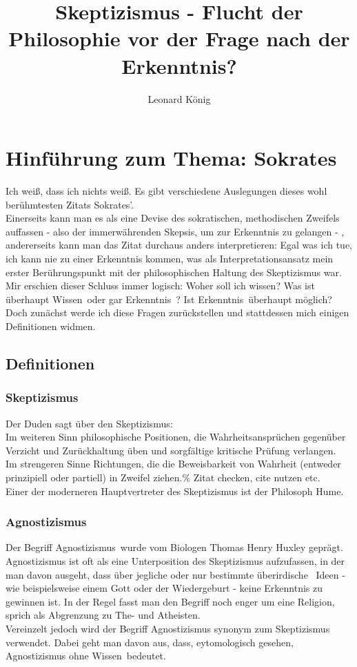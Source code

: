 \documentclass[11pt,a4paper]{article}
\author{Leonard König}
\title{Skeptizismus - Flucht der Philosophie vor der Frage nach der Erkenntnis?}
\begin{document}
\maketitle
\tableofcontents
\newpage
\section{Hinführung zum Thema: Sokrates}
\glqq Ich weiß, dass ich nichts weiß\grqq. Es gibt verschiedene Auslegungen dieses wohl berühmtesten Zitats Sokrates'.%
\\Einerseits kann man es als eine Devise des sokratischen, methodischen Zweifels auffassen - also der immerwährenden Skepsis, um zur Erkenntnis zu gelangen - , andererseits kann man das Zitat durchaus anders interpretieren: Egal was ich tue, ich kann nie zu einer Erkenntnis kommen, was als Interpretationsansatz mein erster Berührungspunkt mit der philosophischen Haltung des Skeptizismus war.\\
Mir erschien dieser Schluss immer logisch: Woher soll ich \glqq wissen\grqq? Was ist überhaupt \glqq Wissen\grqq\ oder gar \glqq Erkenntnis\grqq\ ? Ist \glqq Erkenntnis\grqq\ überhaupt möglich?\\
Doch zunächst werde ich diese Fragen zurückstellen und stattdessen mich einigen Definitionen widmen.
	\subsection{Definitionen}
		\subsubsection{Skeptizismus}
Der Duden sagt über den Skeptizismus:\\
\glqq Im weiteren Sinn philosophische Positionen, die Wahrheitsansprüchen gegenüber Verzicht und Zurückhaltung üben und sorgfältige kritische Prüfung verlangen.\\
Im strengeren Sinne Richtungen, die die Beweisbarkeit von Wahrheit (entweder prinzipiell oder partiell) in Zweifel ziehen.\grqq\% Zitat checken, cite nutzen etc.
\\Einer der moderneren Hauptvertreter des Skeptizismus ist
der Philosoph Hume.\\%
		\subsubsection{Agnostizismus}
Der Begriff \glqq Agnostizismus\grqq\ wurde vom Biologen Thomas Henry Huxley geprägt. Agnostizismus ist oft als eine Unterposition des Skeptizismus aufzufassen, in der man davon ausgeht, dass über jegliche oder nur bestimmte überirdische%
\ Ideen - wie beispielsweise einem Gott oder der Wiedergeburt - keine Erkenntnis zu gewinnen ist. In der Regel fasst man den Begriff noch enger um eine Religion, sprich als Abgrenzung zu The- und Atheisten.\\ 
Vereinzelt jedoch wird der Begriff Agnostizismus synonym zum Skeptizismus verwendet. Dabei geht man davon aus, dass, eytomologisch gesehen, Agnostizismus \glqq ohne Wissen\grqq\ bedeutet.
\end{document}
